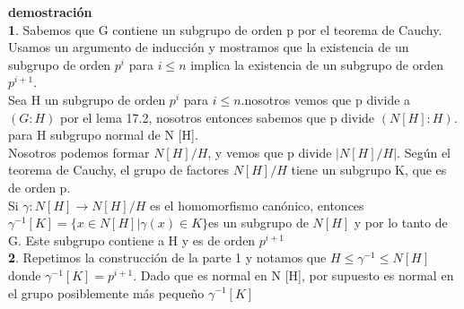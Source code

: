 \documentclass{article}
\begin{document}
\textbf{demostración}\\
\textbf{1}. Sabemos que G contiene un subgrupo de orden p por el teorema de Cauchy. Usamos un argumento de inducción y mostramos que la existencia de un subgrupo de orden $p^{i}$ para $i \leq n$ implica la existencia de un subgrupo de orden $p^{i+1}$. \\
Sea H un subgrupo de orden $p^{i}$ para $i \leq n $.nosotros vemos que p divide a $(G:H)$ por el lema 17.2, nosotros entonces  sabemos que p divide $(N [H]: H).$para H subgrupo normal de N [H].\\
Nosotros podemos formar $N [H] / H$, y vemos que p divide $|N [H] / H|.$ Según el teorema de Cauchy, el grupo de factores $N [H] / H$ tiene un subgrupo K, que es de orden p. \\
Si $\gamma: N [H] \longrightarrow N [H] / H$ es el homomorfismo canónico, entonces $\gamma^{-1} [K] = \{x \in N [H] | \gamma (x) \in K\} $es un subgrupo de $N [H]$ y por lo tanto de G. Este subgrupo contiene a H y es de orden $p^{i+1}$\\

\textbf{2}. Repetimos la construcción de la parte 1 y notamos que $ H \leq \gamma ^ {- 1} \leq N [H] $ donde $ \gamma ^ {- 1} [K] = p ^ {i + 1} $. Dado que es normal en N [H], por supuesto es normal en el grupo posiblemente más pequeño $ \gamma ^ {- 1} [K] $
\end{document}
